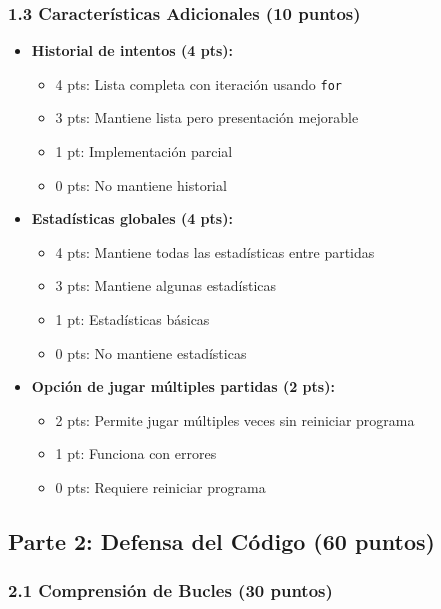 \documentclass[12pt,a4paper]{article}
\begin{document}
\subsubsection{1.3 Características Adicionales (10 puntos)}

\begin{itemize}[leftmargin=*]
    \item \textbf{Historial de intentos (4 pts):}
    \begin{itemize}
        \item 4 pts: Lista completa con iteración usando \texttt{for}
        \item 3 pts: Mantiene lista pero presentación mejorable
        \item 1 pt: Implementación parcial
        \item 0 pts: No mantiene historial
    \end{itemize}
    
    \item \textbf{Estadísticas globales (4 pts):}
    \begin{itemize}
        \item 4 pts: Mantiene todas las estadísticas entre partidas
        \item 3 pts: Mantiene algunas estadísticas
        \item 1 pt: Estadísticas básicas
        \item 0 pts: No mantiene estadísticas
    \end{itemize}
    
    \item \textbf{Opción de jugar múltiples partidas (2 pts):}
    \begin{itemize}
        \item 2 pts: Permite jugar múltiples veces sin reiniciar programa
        \item 1 pt: Funciona con errores
        \item 0 pts: Requiere reiniciar programa
    \end{itemize}
\end{itemize}

\subsection{Parte 2: Defensa del Código (60 puntos)}

\subsubsection{2.1 Comprensión de Bucles (30 puntos)}
\end{document}
